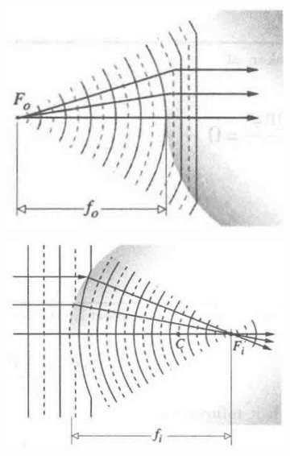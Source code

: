\begin{figure}[H]
  \centering
  \begin{subfigure}{.3\textwidth}
    \centering
    \includegraphics[width=\linewidth]{figures/Refraction-at-a-Spherical-Interface-1.jpg}
  \end{subfigure}
  \hspace{2cm}
  \begin{subfigure}{.4\textwidth}
    \centering
    \includegraphics[width=\linewidth]{figures/Refraction-at-a-Spherical-Interface-2.jpg}
  \end{subfigure}
\end{figure}

